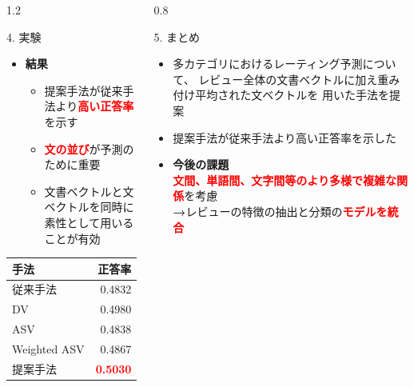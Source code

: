 \documentclass[unicode,10pt]{beamer}
\newlength{\mycolumnwidth}
\newcommand{\arrow}{\textcolor{ttiblue}{\textbf{→}}\hspace{1ex}}
\newcommand{\itemtitle}[1]{\textbf{#1}\\}
\newcommand{\fire}[1]{\textcolor{red}{\textbf{#1}}}
\begin{document}
\begin{frame}
\begin{columns}[onlytextwidth,t]
\begin{column}{1.2\mycolumnwidth}
\begin{block}{4. 実験}
      \begin{multicols}{2}
        \begin{itemize}
          \item \itemtitle{結果}
            \begin{itemize}
              \item 提案手法が従来手法より\fire{高い正答率}を示す
              \item \fire{文の並び}が予測のために重要
              \item 文書ベクトルと文ベクトルを同時に素性として用いることが有効
            \end{itemize}
        \end{itemize}
        \columnbreak
        \begin{table}
          \centering
          \begin{tabular}{l | r}
            手法 & 正答率 \\
            \hline
            従来手法\cite{fujitani15} & 0.4832 \\
            DV & 0.4980 \\
            ASV & 0.4838 \\
            Weighted ASV & 0.4867 \\
            提案手法 & \fire{0.5030} \\
          \end{tabular}
        \end{table}
      \end{multicols}
    \end{block}
  \end{column}

  \begin{column}{0.8\mycolumnwidth}
    \begin{block}{5. まとめ}
      \begin{itemize}
        \item 多カテゴリにおけるレーティング予測について、
              レビュー全体の文書ベクトルに加え重み付け平均された文ベクトルを
              用いた手法を提案
        \item 提案手法が従来手法\cite{fujitani15}より高い正答率を示した
        \item \itemtitle{今後の課題}
              \fire{文間、単語間、文字間等のより多様で複雑な関係}を考慮 \\
              \arrow レビューの特徴の抽出と分類の\fire{モデルを統合}
      \end{itemize}
    \end{block}


\end{column}
\end{columns}
\end{frame}
\end{document}
